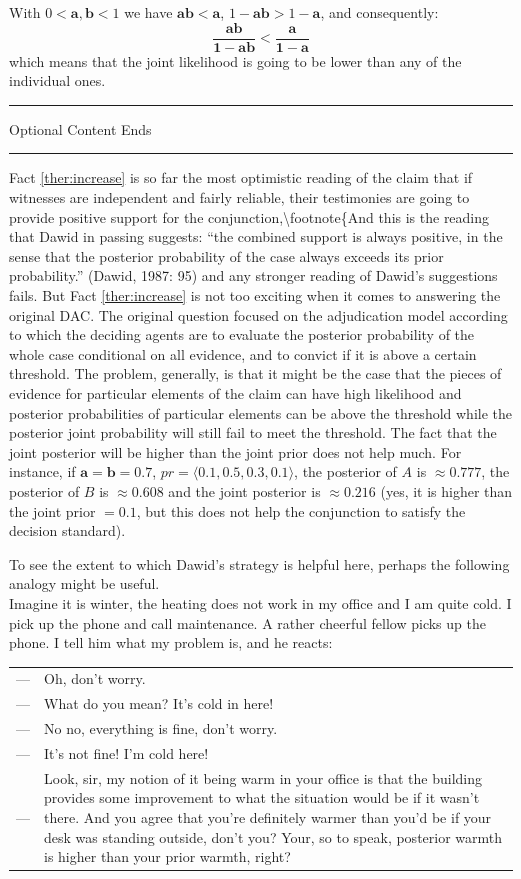 \documentclass[10pt,dvipsnames,enabledeprecatedfontcommands]{scrartcl}
\newcommand{\ra}{\rangle}
\newcommand{\la}{\langle}
\newcommand{\intermezzob}{\nopagebreak 
	\begin{minipage}[c]{13cm}
	\begin{center}\rule{10cm}{0.4pt}

	\tiny{\sc Optional Content Ends}
	
	\vspace{-1mm}
	
	\rule{10cm}{0.4pt}\end{center}
	\end{minipage}
	}
\begin{document}
With \(0<\mathbf{a},\mathbf{b}<1\) we have \(\mathbf{ab}<\mathbf{a}\),
\(1-\mathbf{ab}>1-\mathbf{a}\), and consequently:
\[\frac{\mathbf{ab}}{\mathbf{1-ab}} < \frac{\mathbf{a}}{\mathbf{1-a}}\]
which means that the joint likelihood is going to be lower than any of
the individual ones.

\intermezzob

Fact \ref{ther:increase} is so far the most optimistic reading of the
claim that if witnesses are independent and fairly reliable, their
testimonies are going to provide positive support for the
conjunction,\textbackslash{}footnote\{And this is the reading that Dawid
in passing suggests: ``the combined support is always positive, in the
sense that the posterior probability of the case always exceeds its
prior probability.'' (Dawid, 1987: 95) and any stronger reading of
Dawid's suggestions fails. But Fact \ref{ther:increase} is not too
exciting when it comes to answering the original DAC. The original
question focused on the adjudication model according to which the
deciding agents are to evaluate the posterior probability of the whole
case conditional on all evidence, and to convict if it is above a
certain threshold. The problem, generally, is that it might be the case
that the pieces of evidence for particular elements of the claim can
have high likelihood and posterior probabilities of particular elements
can be above the threshold while the posterior joint probability will
still fail to meet the threshold. The fact that the joint posterior will
be higher than the joint prior does not help much. For instance, if
\(\mathbf{a}=\mathbf{b}=0.7\), \(pr=\la 0.1, 0.5, 0.3, 0.1\ra\), the
posterior of \(A\) is \(\approx 0.777\), the posterior of \(B\) is
\(\approx 0.608\) and the joint posterior is \(\approx 0.216\) (yes, it
is higher than the joint prior \(=0.1\), but this does not help the
conjunction to satisfy the decision standard).

To see the extent to which Dawid's strategy is helpful here, perhaps the
following analogy might be useful.\\
Imagine it is winter, the heating does not work in my office and I am
quite cold. I pick up the phone and call maintenance. A rather cheerful
fellow picks up the phone. I tell him what my problem is, and he reacts:

\vspace{1mm}

\begin{tabular}{lp{10cm}}
 --- & Oh, don't worry. \\
 --- & What do you mean? It's cold in here! \\
 --- & No no, everything is fine, don't worry.\\
 --- & It's not fine! I'm cold here! \\
 --- & Look, sir, my notion of it being warm in your office is that the building provides some improvement to what the situation would be if it wasn't there. And you agree that you're definitely warmer than you'd be if your desk was standing outside, don't you? Your, so to speak, posterior warmth is higher than your prior warmth, right? 
 \end{tabular}
 \vspace{1mm}
\end{document}
